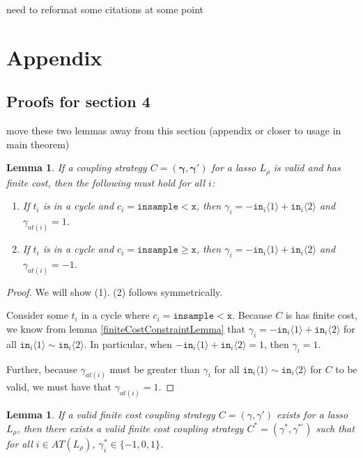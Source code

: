 \documentclass[12pt]{article}
\newcommand{\gguard}[1][x]{\texttt{insample}\geq #1}
\newcommand{\lguard}[1][x]{\texttt{insample} < #1}
\newcommand{\brangle}[1]{\langle #1 \rangle}
\newtheorem{lemma}[thm]{Lemma}
\theoremstyle{definition}
\begin{document}
{\color{red} need to reformat some citations at some point}



\section{Appendix}

\subsection{Proofs for section 4}

{\color{red} move these two lemmas away from this section (appendix or closer to usage in main theorem)}

\begin{lemma}\label{cycleGammaConstraints}
    If a coupling strategy $C=(\mathbf{\gamma}, \mathbf{\gamma}')$ for a lasso $L_\rho$ is valid and has finite cost, then the following must hold for all $i$:
    \begin{enumerate}
        \item If $t_i$ is in a cycle and $c_i = \lguard[\texttt{x}]$, then $\gamma_i = -\texttt{in}_i\brangle{1}+\texttt{in}_i\brangle{2}$ and $\gamma_{at(i)} = 1$.
        \item If $t_i$ is in a cycle and $c_i = \gguard[\texttt{x}]$, then $\gamma_i = -\texttt{in}_i\brangle{1}+\texttt{in}_i\brangle{2}$ and $\gamma_{at(i)} = -1$.
    \end{enumerate}
\end{lemma}
\begin{proof}
    We will show (1). (2) follows symmetrically.

    Consider some $t_i$ in a cycle where $c_i = \lguard[\texttt{x}]$. Because $C$ is has finite cost, we know from lemma \ref{finiteCostConstraintLemma} that $\gamma_i = -\texttt{in}_i\brangle{1}+\texttt{in}_i\brangle{2}$ for all  $\texttt{in}_i\brangle{1}\sim\texttt{in}_i\brangle{2}$. In particular, when $-\texttt{in}_i\brangle{1}+\texttt{in}_i\brangle{2}=1$, then $\gamma_i=1$. 
    
    Further, because $\gamma_{at(i)}$ must be greater than $\gamma_i$ for all $\texttt{in}_i\brangle{1}\sim\texttt{in}_i\brangle{2}$ for $C$ to be valid, we must have that $\gamma_{at(i)}=1$.
\end{proof}
\begin{lemma}
    If a valid finite cost coupling strategy $C = (\gamma, \gamma')$ exists for a lasso $L_\rho$, then there exists a valid finite cost coupling strategy $C^*= (\gamma^*, \gamma^{*\prime})$ such that for all $i\in AT(L_\rho)$, $\gamma_i^*\in \{-1, 0, 1\}$. 
\end{lemma}
\end{document}
